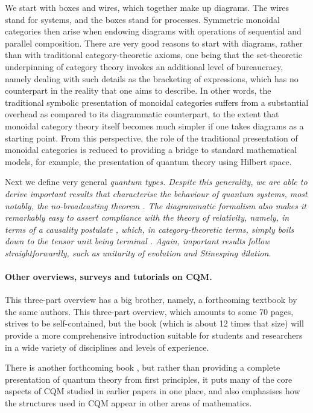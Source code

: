 \documentclass[10pt]{article}
\begin{document}
We start with boxes and wires, which together make up diagrams.  The wires stand for systems, and the boxes stand for processes.  Symmetric monoidal categories then arise when endowing diagrams with operations of sequential and parallel composition. There are very good reasons to start with diagrams, rather than with traditional category-theoretic axioms, one being that the set-theoretic underpinning of category theory invokes an additional level of bureaucracy, namely dealing with such details as the bracketing of expressions, which has no counterpart in the reality that one aims to describe.  In other words, the traditional symbolic presentation of monoidal categories suffers from a substantial overhead as compared to its diagrammatic counterpart, to the extent that  monoidal category theory itself  becomes much simpler if one takes diagrams as  a starting point.  From this perspective, the role of the traditional presentation of  monoidal categories is reduced to providing a bridge to standard mathematical models, for example, the presentation of quantum theory using Hilbert space.

Next we define very general \em quantum types\em.  Despite this generality, we are able to derive important results that characterise the behaviour of quantum systems, most notably, the \em no-broadcasting theorem \em \cite{Nobroadcast}.  The diagrammatic formalism also makes it remarkably easy to assert  compliance with the theory of relativity, namely, in terms of a \em causality postulate \em \cite{chiri1}, which, in category-theoretic terms, simply boils down to the tensor unit being terminal \cite{Cnonsig}.  Again, important results follow straightforwardly, such as \em unitarity of evolution \em and \em Stinesping dilation\em.

\paragraph{Other overviews, surveys and tutorials on CQM.}  This three-part overview %
has a big brother, namely, a forthcoming textbook \cite{CKbook}  by the same authors. This three-part overview,  which amounts to some 70 pages, strives to be self-contained, but the book (which is about 12 times that size) will provide a more comprehensive introduction suitable for students and researchers in a wide variety of disciplines and levels of experience.

There is  another forthcoming book \cite{HVbook}, but rather than providing a complete presentation of quantum theory  from first principles, it puts  many of the core aspects of CQM studied in earlier papers in one place, and  also emphasises how the structures used in CQM  appear in other areas of mathematics.
\end{document}
